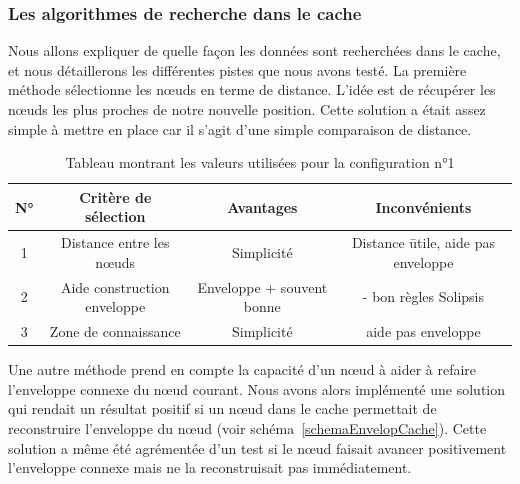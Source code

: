 \subsubsection{Les algorithmes de recherche dans le cache}
\par Nous allons expliquer de quelle façon les données sont recherchées dans le cache, et nous détaillerons les différentes pistes que nous avons testé. La première méthode sélectionne les nœuds en terme de distance. L'idée est de récupérer les nœuds les plus proches de notre nouvelle position. Cette solution a était assez simple à mettre en place car il s'agit d'une simple comparaison de distance. 
\begin{table}[!h]
  \begin{center}
    \begin{tabular}{|c|c|c|c|}
      \hline
      N° & Critère de sélection & Avantages & Inconvénients\\
      \hline
      	1 & Distance entre les nœuds & Simplicité & Distance \= utile, aide pas enveloppe\\
      	2 & Aide construction enveloppe & Enveloppe + souvent bonne  & - bon règles Solipsis\\
      	3 & Zone de connaissance & Simplicité & aide pas enveloppe\\
      \hline
    \end{tabular}
  \end{center}
  \label{tab:config1}
  \caption{Tableau montrant les valeurs utilisées pour la configuration n°1}
\end{table}


\par Une autre méthode prend en compte la capacité d'un nœud à aider à refaire l'enveloppe connexe du nœud courant. Nous avons alors implémenté une solution qui rendait un résultat positif si un nœud dans le cache permettait de reconstruire l'enveloppe du nœud (voir schéma~\ref{schemaEnvelopCache}). Cette solution a même été agrémentée d'un test si le nœud faisait avancer positivement l'enveloppe connexe mais ne la reconstruisait pas immédiatement.

